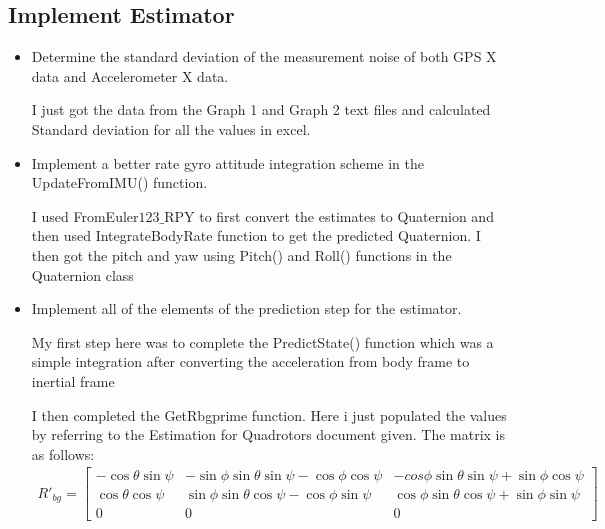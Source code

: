 \documentclass{article}
\begin{document}
\subsection{Implement Estimator}
\begin{itemize}
\item Determine the standard deviation of the measurement noise of both GPS X data and Accelerometer X data.

I just got the data from the Graph 1 and Graph 2 text files and calculated Standard deviation for all the values in excel.

\item Implement a better rate gyro attitude integration scheme in the UpdateFromIMU() function.

I used FromEuler$123\_$RPY to first convert the estimates to Quaternion and then used IntegrateBodyRate function to get the predicted Quaternion. I then got the pitch and yaw using Pitch() and Roll() functions in the Quaternion class

\item Implement all of the elements of the prediction step for the estimator.

My first step here was to complete the PredictState() function which was a simple integration after converting the acceleration from body frame to inertial frame

I then completed the GetRbgprime function. Here i just populated the values by referring to the Estimation for Quadrotors document given. The matrix is as follows:
\begin{align}
R'_{bg} = \left[
  \begin{array}{ccc}
    -\cos \theta \sin \psi&
    -\sin\phi \sin \theta \sin \psi - \cos \phi \cos \psi&
    -cos \phi \sin \theta \sin \psi + \sin \phi \cos \psi\\
    \cos \theta \cos \psi&
    \sin \phi \sin \theta \cos \psi - \cos \phi \sin \psi&
    \cos \phi \sin \theta \cos \psi + \sin \phi \sin \psi\\
    0&0&0
  \end{array}
  \right]
\end{align}


\end{itemize}
\end{document}
